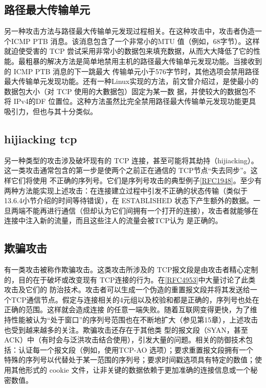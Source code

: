 \subsection{路径最大传输单元}
另一种攻击方法与路径最大传输单元发现过程相关。在这种攻击中，攻击者伪造一个ICMP PTB 消息。该消息包含了一个非常小的MTU
值（例如，68字节）。这样就迫使受害的
TCP 尝试采用非常小的数据包来填充数据，从而大大降低了它的性能。最粗暴的解决方法是简单地禁用主机的路径最大传输单元发现功能。当接收到的
ICMP PTB 消息的下一跳最大
传输单元小于576字节时，其他选项会禁用路径最大传输单元发现功能。还有一种Linux实现的方法，前文曾介绍过，是使最小的数据包大小（对
TCP 使用的大數据包）固定为某一数
据，并使较大的数据包不将 IPv4的DF 位置位。这种方法虽然比完全禁用路径最大传输单元发现功能更具吸引力，但也与其十分类似。

\subsection{hijiacking tcp}
另一种类型的攻击涉及破坏现有的 TCP 连接，甚至可能将其劫持（hijiacking）。这一类攻击通常包含的第一步是使两个之前正在通信的
TCP节点“失去同步”。这样它们将使用
不正确的序列号。它们是序列号攻击的典型例子\href{https://www.rfc-editor.org/rfc/rfc1948}{[RFC1948]}。至少有两种方法能实现上述攻击：在连接建立过程中引发不正确的状态传输（类似于13.6.4小节介绍的时间等待错误），在
ESTABLISHED
状态下产生额外的数据。一旦两端不能再进行通信（但却认为它们间拥有一个打开的连接），攻击者就能够在连接中注入新的流量，而且这些注人的流量会被TCP认为
是正确的。

\subsection{欺骗攻击}
有一类攻击被称作欺骗攻击。这类攻击所涉及的 TCP报文段是由攻击者精心定制的，目的在于破坏或改变现有
TCP连接的行为。在\href{https://www.rfc-editor.org/rfc/rfc4953}{[RFC4953]}中大量讨论了此类攻击及它们的
防治技术。攻击者可以生成一个伪造的重置报文段并将其发送给一个TCP通信节点。假定与连接相关的4元组以及校验和都是正确的，序列号也处在正确的范围。这样就会造成连接
的任意一端失败。随着互联网变得更快，为了维持性能被认为“处于窗口”的序列号范围也在不断地扩大（参见第15章），上述攻击也受到越来越多的关注。欺骗攻击还存在于其他类
型的报文段（SYAN，甚至
ACK）中（有时会与泛洪攻击结合使用），引发大量的问题。相关的防御技术包括：认证每一个报文段（例如，使用TCP-AO 选项）；要求重置报文段拥有一个
特殊的序列号以代替处于某一范围的序列号；要求时间戳选项具有特定的数值；使用其他形式的 cookie 文件，让非关键的数据依赖于更加准确的连接信息或一个秘密数值。

